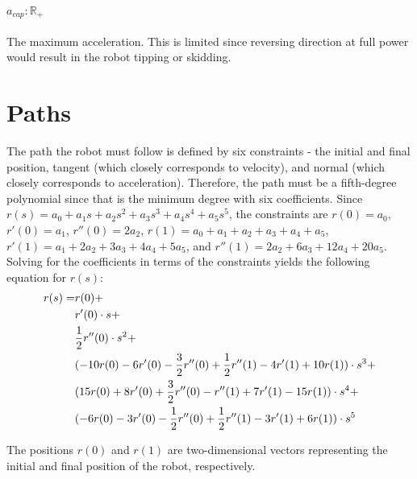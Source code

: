 \documentclass{article}
\begin{document}
\paragraph{$a_{cap}: \mathbb{R}_+$} The maximum acceleration. This is limited since
reversing direction at full power would result in the robot tipping or skidding.

\section{Paths}
The path the robot must follow is defined by six constraints - the initial and final position,
tangent (which closely corresponds to velocity), and normal (which closely corresponds to acceleration).
Therefore, the path must be a fifth-degree polynomial since that is the minimum degree with six coefficients.
Since $r(s)=a_0+a_1s+a_2s^2+a_3s^3+a_4s^4+a_5s^5$, the constraints are
$r(0)=a_0$, $r'(0)=a_1$, $r''(0)=2a_2$, $r(1)=a_0+a_1+a_2+a_3+a_4+a_5$,
$r'(1)=a_1+2a_2+3a_3+4a_4+5a_5$, and $r''(1)=2a_2+6a_3+12a_4+20a_5$. Solving for the coefficients in
terms of the constraints yields the following equation for $r(s)$:
\begin{align}
\notag r(s)=&r(0)+\\
\notag      &r'(0) \cdot s+\\
\notag      &\frac{1}{2}r''(0) \cdot s^2+\\
\notag      &(-10r(0)-6r'(0)-\frac{3}{2}r''(0)+\frac{1}{2}r''(1)-4r'(1)+10r(1)) \cdot s^3+\\
\notag      &(15r(0)+8r'(0)+\frac{3}{2}r''(0)-r''(1)+7r'(1)-15r(1)) \cdot s^4+\\
            &(-6r(0)-3r'(0)-\frac{1}{2}r''(0)+\frac{1}{2}r''(1)-3r'(1)+6r(1)) \cdot s^5
\end{align}

The positions $r(0)$ and $r(1)$ are two-dimensional vectors representing the initial and final position of the robot, respectively.
\end{document}
